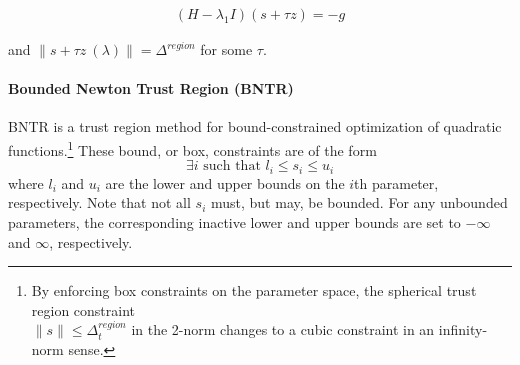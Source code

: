 \begin{align}
    \left(H-\lambda_1 I\right)(s+\tau z)=-g
    \label{eq:hard-case}
\end{align}

and $ \lVert s +\tau z \ (\lambda) \rVert  = \Delta^{region}  $ for some $\tau$.





\paragraph{Bounded Newton Trust Region (BNTR)}

BNTR is a trust region method for bound-constrained optimization of quadratic functions.\footnote{By enforcing box constraints on the parameter space, the spherical trust region constraint \\
$\lVert s \rVert \leq \Delta^{region}_{t}$ in the 2-norm changes to a cubic constraint in an infinity-norm sense.}
These bound, or box, constraints are of the form 
$$\exists i \text{ such that } l_i \leq s_i \leq u_i$$
where $l_i$ and $u_i$ are the lower and upper bounds on the $i$th parameter, respectively. 
Note that not all $s_i$ must, but may, be bounded. For any unbounded parameters, the corresponding inactive lower and upper bounds are set to $-\infty$ and $\infty$, respectively. 


